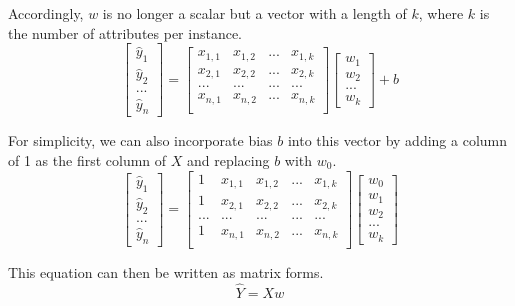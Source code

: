\documentclass[
	letterpaper
]{article}
\begin{document}
Accordingly, $w$ is no longer a scalar but a vector with a length of $k$, where $k$ is the number of attributes per instance.
\begin{equation}
\begin{bmatrix}\hat y_1 \\ \hat y_2 \\ ... \\ \hat y_n\end{bmatrix}
 = \begin{bmatrix}
x_{1, 1} & x_{1, 2} & ... & x_{1, k} \\
x_{2, 1} & x_{2, 2} & ... & x_{2, k} \\
... & ... & ... & ... \\
x_{n, 1} & x_{n, 2} & ... & x_{n, k} \\
\end{bmatrix}
\begin{bmatrix} w_1 \\  w_2 \\ ... \\ w_k\end{bmatrix}
+b
\end{equation}

For simplicity, we can also incorporate bias $b$ into this vector by adding a column of 1 as the first column of $X$ and replacing $b$ with $w_0$.
\begin{equation}
\begin{bmatrix}\hat y_1 \\ \hat y_2 \\ ... \\ \hat y_n\end{bmatrix}
 = \begin{bmatrix}
1 & x_{1, 1} & x_{1, 2} & ... & x_{1, k} \\
1 & x_{2, 1} & x_{2, 2} & ... & x_{2, k} \\
... & ... & ... & ... & ... \\
1 & x_{n, 1} & x_{n, 2} & ... & x_{n, k} \\
\end{bmatrix}
\begin{bmatrix} w_0 \\ w_1 \\  w_2 \\ ... \\ w_k\end{bmatrix}
\end{equation}

This equation can then be written as matrix forms.
\begin{equation}
\hat Y= X w
\end{equation}
\end{document}
